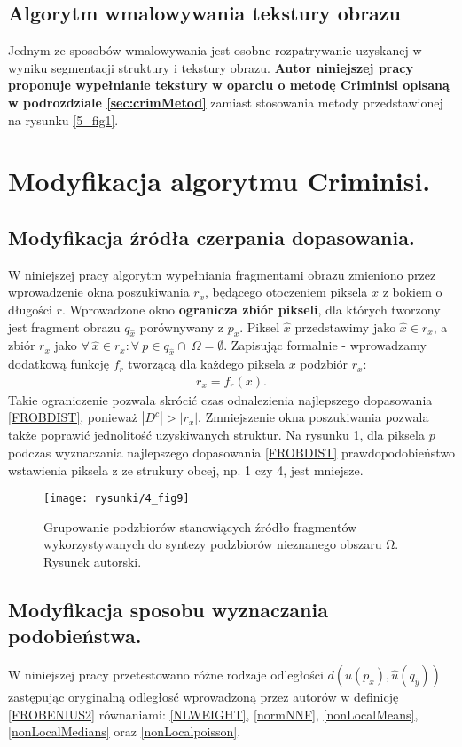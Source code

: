 \documentclass[a4paper,12pt,twoside,openany]{report}
\begin{document}
\subsection{Algorytm wmalowywania tekstury obrazu}
Jednym ze sposobów wmalowywania jest osobne rozpatrywanie uzyskanej w wyniku segmentacji struktury i tekstury obrazu. \textbf{Autor niniejszej pracy proponuje wypełnianie tekstury w oparciu o metodę Criminisi opisaną w podrozdziale \ref{sec:crimMetod}} zamiast stosowania metody przedstawionej na rysunku \ref{5_fig1}.
\section{Modyfikacja algorytmu Criminisi.}
\label{ssec:crimMod}
\subsection{Modyfikacja źródła czerpania dopasowania.}
\label{ssec:crimModSource}
W niniejszej pracy algorytm wypełniania fragmentami obrazu zmieniono przez wprowadzenie okna poszukiwania $r_x$, będącego otoczeniem piksela $x$ z bokiem o długości $r$. Wprowadzone okno \textbf{ogranicza zbiór pikseli}, dla których tworzony jest fragment obrazu $q_{\hat{x}}$ porównywany z $p_{x}$.
Piksel $\hat{x}$ przedstawimy jako $\hat{x} \in r_x$, a zbiór $r_x$ jako 
$\forall \ \hat{x} \in r_x: \forall \ p \in q_{\hat{x}} \cap \ \Omega = \emptyset$. Zapisując formalnie - wprowadzamy dodatkową funkcję $f_r$ tworzącą dla każdego piksela $x$ podzbiór $r_x$:
\begin{align}
r_x = f_r(x).
\end{align}
Takie ograniczenie pozwala skrócić czas odnalezienia najlepszego dopasowania \eqref{FROBDIST}, ponieważ $|D^c| > |r_x|$. Zmniejszenie okna poszukiwania pozwala także poprawić jednolitość uzyskiwanych struktur. Na rysunku \ref{4_fig9}, dla piksela $p$ podczas wyznaczania najlepszego dopasowania \eqref{FROBDIST} prawdopodobieństwo wstawienia piksela z ze strukury obcej, np. 1 czy 4, jest mniejsze.
\begin{figure}[!h]
	\centering
	\texttt{[image: rysunki/4\_fig9]}
	\caption{Grupowanie podzbiorów stanowiących źródło fragmentów wykorzystywanych do syntezy podzbiorów nieznanego obszaru $\boldsymbol{\mathrm{\Omega }}$. Rysunek autorski.}
\label{4_fig9}
\end{figure}
\subsection{Modyfikacja sposobu wyznaczania podobieństwa.}
\label{ssec:modDistForCrim}
W niniejszej pracy przetestowano różne rodzaje odległości $d\left( u(p_x), \hat{u} (q_{\hat{y}}) \right)$  zastępując oryginalną odległosć wprowadzoną przez autorów w \cite{criminisi2004region} definicję \eqref{FROBENIUS2} równaniami: \eqref{NLWEIGHT}, \eqref{normNNF}, \eqref{nonLocalMeans}, \eqref{nonLocalMedians} oraz \eqref{nonLocalpoisson}.
\end{document}
